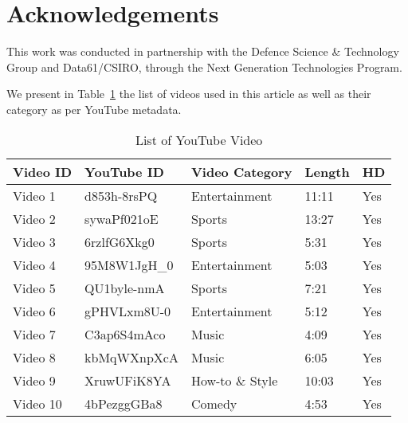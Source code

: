 \documentclass[conference]{IEEEtran}
\begin{document}
	\section*{Acknowledgements}
	This work was conducted in partnership with the Defence Science \& Technology Group and Data61/CSIRO, through the Next Generation Technologies Program.
	
	
	
	
	\appendix
	
	We present in Table~\ref{table:videos} the list of videos used in this article as well as their category as per YouTube metadata. 
	
	\begin{table}[h!]
\centering
\caption{List of YouTube Video}
\label{table:videos}
\begin{tabular}{ lllll  }
 \toprule
  \textbf{Video ID} & \textbf{YouTube ID}&\textbf{Video Category} &\textbf{Length} &\textbf{HD}\\
 \midrule
Video 1 & d853h-8rsPQ & Entertainment & 11:11 & Yes\\
Video 2 & sywaPf021oE & Sports & 13:27 & Yes\\
Video 3 & 6rzlfG6Xkg0 & Sports & 5:31 & Yes\\
Video 4 & 95M8W1JgH\_0 & Entertainment & 5:03 & Yes\\
Video 5 & QU1byle-nmA & Sports & 7:21 & Yes\\
Video 6 & gPHVLxm8U-0 & Entertainment & 5:12 & Yes\\
Video 7 & C3ap6S4mAco & Music& 4:09 & Yes\\
Video 8 & kbMqWXnpXcA & Music& 6:05 & Yes\\
Video 9 & XruwUFiK8YA & How-to \& Style& 10:03 & Yes\\
Video 10 & 4bPezggGBa8 & Comedy & 4:53 & Yes\\
 \bottomrule
\end{tabular}
\end{table}
\end{document}
